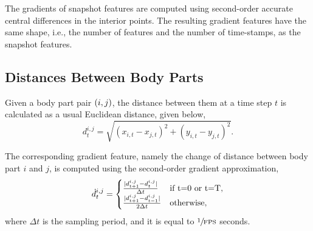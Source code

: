 The gradients of snapshot features are computed using second-order accurate central differences in the interior points.
The resulting gradient features have the same shape, i.e., the number of features and the number of time-stamps, as the snapshot features.

\subsection{Distances Between Body Parts}
Given a body part pair $\left(i,j\right)$, the distance between them at a time step $t$ is calculated as a usual Euclidean distance, given below,
\begin{equation}
	d^{i,j}_t = \sqrt{(x_{i,t} - x_{j,t})^2 + (y_{i,t} - y_{j,t})^2}.
\end{equation}

The corresponding gradient feature, namely the change of distance between body part $i$ and $j$, is computed using the second-order gradient approximation,
\begin{equation}
	\dot{d}^{i,j}_t = \begin{cases} \frac{\abs*{d^{i,j}_{t+1} - d^{i,j}_{t}}}{\Delta t} & \textnormal{if } $t=0$ \textnormal{ or } $t=T$, \\ \frac{\abs*{d^{i,j}_{t+1} - d^{i,j}_{t-1}}}{2\Delta t} & \textnormal{otherwise}, \end{cases}
\end{equation}
where $\Delta t$ is the sampling period, and it is equal to $\sfrac{1}{\textnormal{FPS}}$ seconds.

